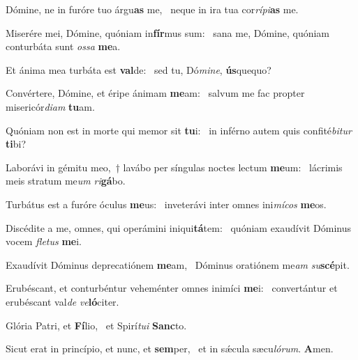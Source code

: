 \item Dómine, ne in furóre tuo árgu\textbf{as} me,~\psstar{} neque in ira tua cor\textit{rípi}\textbf{as} me.
\item Miserére mei, Dómine, quóniam in\textbf{fír}mus sum:~\psstar{} sana me, Dómine, quóniam conturbáta sunt \textit{ossa} \textbf{me}a.
\item Et ánima mea turbáta est \textbf{val}de:~\psstar{} sed tu, Dó\textit{mine}, \textbf{ús}quequo?
\item Convértere, Dómine, et éripe ánimam \textbf{me}am:~\psstar{} salvum me fac propter misericór\textit{diam} \textbf{tu}am.
\item Quóniam non est in morte qui memor sit \textbf{tu}i:~\psstar{} in inférno autem quis confité\textit{bitur} \textbf{ti}bi?
\item Laborávi in gémitu meo,~† lavábo per síngulas noctes lectum \textbf{me}um:~\psstar{} lácrimis meis stratum me\textit{um} \textit{ri}\textbf{gá}bo.
\item Turbátus est a furóre óculus \textbf{me}us:~\psstar{} inveterávi inter omnes ini\textit{mícos} \textbf{me}os.
\item Discédite a me, omnes, qui operámini iniqui\textbf{tá}tem:~\psstar{} quóniam exaudívit Dóminus vocem \textit{fletus} \textbf{me}i.
\item Exaudívit Dóminus deprecatiónem \textbf{me}am,~\psstar{} Dóminus oratiónem me\textit{am} \textit{su}\textbf{scé}pit.
\item Erubéscant, et conturbéntur veheménter omnes inimíci \textbf{me}i:~\psstar{} convertántur et erubéscant val\textit{de} \textit{ve}\textbf{ló}citer.
\item Glória Patri, et \textbf{Fí}lio,~\psstar{} et Spirí\textit{tui} \textbf{Sanc}to.
\item Sicut erat in princípio, et nunc, et \textbf{sem}per,~\psstar{} et in sǽcula sæcu\textit{lórum}. \textbf{A}men.
